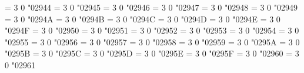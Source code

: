 \Umathchardef\shortrightarrowleftarrow = 3 0 "02944 %
\Umathchardef\rightarrowplus = 3 0 "02945 %
\Umathchardef\leftarrowplus = 3 0 "02946 %
\Umathchardef\rightarrowx = 3 0 "02947 %
\Umathchardef\leftrightarrowcircle = 3 0 "02948 %
\Umathchardef\twoheaduparrowcircle = 3 0 "02949 %
\Umathchardef\leftrightharpoonupdown = 3 0 "0294A %
\Umathchardef\leftrightharpoondownup = 3 0 "0294B %
\Umathchardef\updownharpoonrightleft = 3 0 "0294C %
\Umathchardef\updownharpoonleftright = 3 0 "0294D %
\Umathchardef\leftrightharpoonupup = 3 0 "0294E %
\Umathchardef\updownharpoonrightright = 3 0 "0294F %
\Umathchardef\leftrightharpoondowndown = 3 0 "02950 %
\Umathchardef\updownharpoonleftleft = 3 0 "02951 %
\Umathchardef\barleftharpoonup = 3 0 "02952 %
\Umathchardef\rightharpoonupbar = 3 0 "02953 %
\Umathchardef\barupharpoonright = 3 0 "02954 %
\Umathchardef\downharpoonrightbar = 3 0 "02955 %
\Umathchardef\barleftharpoondown = 3 0 "02956 %
\Umathchardef\rightharpoondownbar = 3 0 "02957 %
\Umathchardef\barupharpoonleft = 3 0 "02958 %
\Umathchardef\downharpoonleftbar = 3 0 "02959 %
\Umathchardef\leftharpoonupbar = 3 0 "0295A %
\Umathchardef\barrightharpoonup = 3 0 "0295B %
\Umathchardef\upharpoonrightbar = 3 0 "0295C %
\Umathchardef\bardownharpoonright = 3 0 "0295D %
\Umathchardef\leftharpoondownbar = 3 0 "0295E %
\Umathchardef\barrightharpoondown = 3 0 "0295F %
\Umathchardef\upharpoonleftbar = 3 0 "02960 %
\Umathchardef\bardownharpoonleft = 3 0 "02961 %
